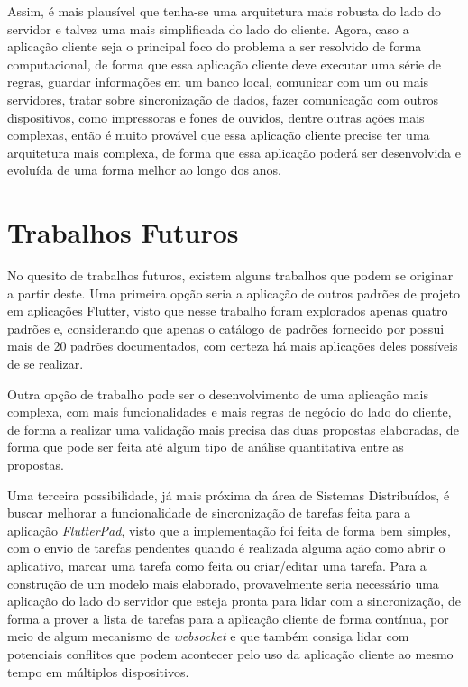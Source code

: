 \documentclass[12pt, %
openright, 
oneside, %
a4paper,    %
brazil]{facom-ufu-abntex2}
\begin{document}
Assim, é mais plausível que tenha-se uma arquitetura mais robusta do lado do servidor e talvez uma mais simplificada do lado do cliente. Agora, caso a aplicação cliente seja o principal foco do problema a ser resolvido de forma computacional, de forma que essa aplicação cliente deve executar uma série de regras, guardar informações em um banco local, comunicar com um ou mais servidores, tratar sobre sincronização de dados, fazer comunicação com outros dispositivos, como impressoras e fones de ouvidos, dentre outras ações mais complexas, então é muito provável que essa aplicação cliente precise ter uma arquitetura mais complexa, de forma que essa aplicação poderá ser desenvolvida e evoluída de uma forma melhor ao longo dos anos.

\section{Trabalhos Futuros} \label{sec:future_work}

No quesito de trabalhos futuros, existem alguns trabalhos que podem se originar a partir deste. Uma primeira opção seria a aplicação de outros padrões de projeto em aplicações Flutter, visto que nesse trabalho foram explorados apenas quatro padrões e, considerando que apenas o catálogo de padrões fornecido por  possui mais de 20 padrões documentados, com certeza há mais aplicações deles possíveis de se realizar.

Outra opção de trabalho pode ser o desenvolvimento de uma aplicação mais complexa, com mais funcionalidades e mais regras de negócio do lado do cliente, de forma a realizar uma validação mais precisa das duas propostas elaboradas, de forma que pode ser feita até algum tipo de análise quantitativa entre as propostas.

Uma terceira possibilidade, já mais próxima da área de Sistemas Distribuídos, é buscar melhorar a funcionalidade de sincronização de tarefas feita para a aplicação \textit{FlutterPad}, visto que a implementação foi feita de forma bem simples, com o envio de tarefas pendentes quando é realizada alguma ação como abrir o aplicativo, marcar uma tarefa como feita ou criar/editar uma tarefa. Para a construção de um modelo mais elaborado, provavelmente seria necessário uma aplicação do lado do servidor que esteja pronta para lidar com a sincronização, de forma a prover a lista de tarefas para a aplicação cliente de forma contínua, por meio de algum mecanismo de \textit{websocket} e que também consiga lidar com potenciais conflitos que podem acontecer pelo uso da aplicação cliente ao mesmo tempo em múltiplos dispositivos.



\postextual



\end{document}
